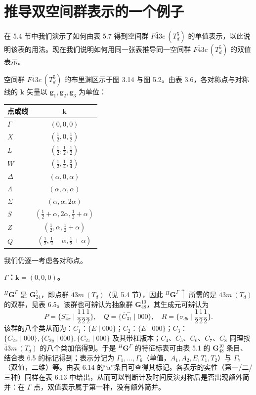 

\section{推导双空间群表示的一个例子}

在 5.4 节中我们演示了如何由表 5.7 得到空间群 $F\bar{4}3c\ (T^{5}_{d})$ 的单值表示，以此说明该表的用法。现在我们说明如何用同一张表推导同一空间群 $F\bar{4}3c\ (T^{5}_{d})$ 的双值表示。

空间群 $F\bar{4}3c\ (T^{5}_{d})$ 的布里渊区示于图 3.14 与图 5.2。由表 3.6，各对称点与对称线的 $\mathbf{k}$ 矢量以 $\mathbf{g}_{1}, \mathbf{g}_{2}, \mathbf{g}_{3}$ 为单位：
\begin{center}
\begin{tabular}{lc}
点或线 & $\mathbf{k}$\\
\midrule
$\Gamma$ & $(0, 0, 0)$\\
$X$ & $(\frac{1}{2}, 0, \frac{1}{2})$\\
$L$ & $(\frac{1}{2}, \frac{1}{2}, \frac{1}{2})$\\
$W$ & $(\frac{1}{2}, \frac{1}{4}, \frac{3}{4})$\\
$\Delta$ & $(\alpha, 0, \alpha)$\\
$\Lambda$ & $(\alpha, \alpha, \alpha)$\\
$\Sigma$ & $(\alpha, \alpha, 2\alpha)$\\
$S$ & $(\frac{1}{2}+\alpha, 2\alpha, \frac{1}{2}+\alpha)$\\
$Z$ & $(\frac{1}{2}, \alpha, \frac{1}{2}+\alpha)$\\
$Q$ & $(\frac{1}{2}, \frac{1}{2}-\alpha, \frac{1}{2}+\alpha)$
\end{tabular}
\end{center}

我们仍逐一考虑各对称点。

\noindent\textbf{$\Gamma$：$\mathbf{k} = (0, 0, 0)$。}

${}^{H}\mathbf{G}^{\Gamma}$ 是 $\mathbf{G}^{7}_{24}$，即点群 $\bar{4}3m\ (T_{d})$（见 5.4 节），因此 ${}^{H}\mathbf{G}^{\Gamma} \uparrow$ 所需的是 $\bar{4}3m\ (T_{d})$ 的双群，见表 6.5。该群也可辨认为抽象群 $\mathbf{G}^{10}_{48}$，其生成元可辨认为
\begin{equation*}
P = \{S^{-}_{4x} \mid {\textstyle\frac{1}{2}}{\textstyle\frac{1}{2}}{\textstyle\frac{1}{2}}\}, \quad Q = \{\overline{C}^{-}_{31} \mid 000\}, \quad R = \{\sigma_{db} \mid {\textstyle\frac{1}{2}}{\textstyle\frac{1}{2}}{\textstyle\frac{1}{2}}\}.
\end{equation*}
该群的八个类从而为：$C_{1}$：$\{E \mid 000\}$；$C_{2}$：$\{\overline{E} \mid 000\}$；$C_{3}$：$\{C_{2x} \mid 000\}, \{C_{2y} \mid 000\}, \{C_{2z} \mid 000\}$ 及其带杠版本；$C_{4}$、$C_{5}$、$C_{6}$、$C_{7}$、$C_{8}$ 同理按 $\bar{4}3m\ (T_{d})$ 的八个类加倍得到。于是 ${}^{H}\mathbf{G}^{\Gamma}$ 的特征标表可由表 5.1 的 $\mathbf{G}^{10}_{48}$ 条目、结合表 6.5 的标记得到；表示分记为 $\Gamma_{1}, \dots, \Gamma_{6}$（单值，$A_{1}, A_{2}, E, T_{1}, T_{2}$）与 $\Gamma_{7}$（双值，二维）等。由表 6.14 的“a”条目可查得其标记。各表示的实性（第一/二/三种）同样在表 6.13 中给出，从而可以判断计及时间反演对称后是否出现额外简并：在 $\Gamma$ 点，双值表示属于第一种，没有额外简并。

